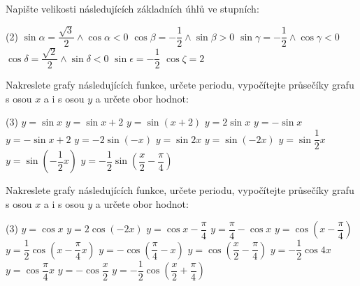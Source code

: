 \documentclass[12pt,a4paper]{article}
\begin{document}
\begin{exercise}
Napište velikosti následujících základních úhlů ve stupních:
\begin{tasks}(2)
    \task $\sin \alpha = \dfrac{\sqrt{3}}{2} \wedge \cos \alpha < 0$
    \task $\cos \beta = -\dfrac{1}{2} \wedge \sin \beta > 0$
    \task $\sin \gamma = -\dfrac{1}{2} \wedge \cos \gamma < 0$
    \task $\cos \delta = \dfrac{\sqrt{2}}{2} \wedge \sin \delta < 0$
    \task $\sin \epsilon = -\dfrac{1}{2}$
    \task $\cos \zeta = 2$
    \end{tasks}
\end{exercise}


\begin{exercise}
    Nakreslete grafy následujících funkce, určete periodu, vypočítejte průsečíky grafu s osou $x$ a i s osou $y$ a určete obor hodnot:
    \begin{tasks}(3)
        \task $y = \sin x $
        \task $y = \sin x + 2$
        \task $y = \sin (x + 2)$
        \task $y = 2 \sin x $
        \task $y = -\sin x $
        \task $y = -\sin x + 2$
        \task $y = -2 \sin(-x)$
        \task $y = \sin 2x$
        \task $y = \sin (-2x)$
        \task $y = \sin \dfrac{1}{2}x$
        \task $y = \sin \left(-\dfrac{1}{2}x\right)$
        \task $y = -\dfrac{1}{2} \sin \left(\dfrac{x}{2} - \dfrac{\pi}{4} \right)$
    \end{tasks}
\end{exercise}


\begin{exercise}
    Nakreslete grafy následujících funkce, určete periodu, vypočítejte průsečíky grafu s osou $x$ a i s osou $y$ a určete obor hodnot:
    \begin{tasks}(3)
        \task $y = \cos x $
        \task $y = 2 \cos (-2x)$
        \task $y = \cos x - \dfrac{\pi}{4}$
        \task $y = \dfrac{\pi}{4} - \cos x$
        \task $y = \cos (x - \dfrac{\pi}{4})$
        \task $y = \dfrac{1}{2}\cos \left(x - \dfrac{\pi}{4}x\right)$
        \task $y = -\cos \left( \dfrac{\pi}{4} - x\right)$
        \task $y = \cos \left( \dfrac{x}{2} - \dfrac{\pi}{4}\right)$
        \task $y = -\dfrac{1}{2} \cos 4x$
        \task $y = \cos \dfrac{\pi}{4}x$
        \task $y = -\cos \dfrac{x}{2}$
        \task $y = -\dfrac{1}{2} \cos \left(\dfrac{x}{2} + \dfrac{\pi}{4} \right)$
    \end{tasks}
\end{exercise}
\end{document}
